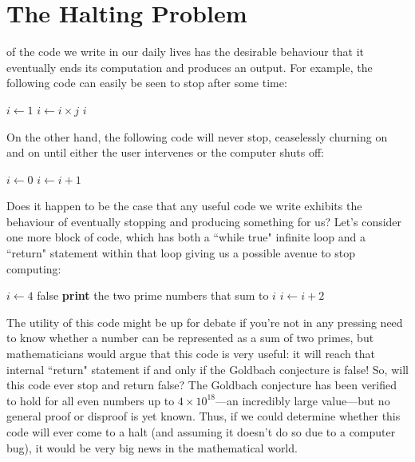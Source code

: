 \section{The Halting Problem}\label{sec:haltingproblem}

 of the code we write in our daily lives has the desirable behaviour that it eventually ends its computation and produces an output. For example, the following code can easily be seen to stop after some time:
\begin{colouredbox}
\begin{algorithmic}
\State $i \gets 1$
	\State $i \gets i \times j$
\EndFor
\State \Return $i$
\end{algorithmic}
\end{colouredbox}
\noindent
On the other hand, the following code will never stop, ceaselessly churning on and on until either the user intervenes or the computer shuts off:
\begin{colouredbox}
\begin{algorithmic}
\State $i \gets 0$
	\State $i \gets i + 1$
\EndWhile
\end{algorithmic}
\end{colouredbox}
\noindent
Does it happen to be the case that any useful code we write exhibits the behaviour of eventually stopping and producing something for us? Let's consider one more block of code, which has both a ``while true" infinite loop and a ``return" statement within that loop giving us a possible avenue to stop computing:
\begin{colouredbox}
\begin{algorithmic}
\State $i \gets 4$
		\State \Return false
	\Else
		\State \textbf{print} the two prime numbers that sum to $i$
		\State $i \gets i + 2$
	\EndIf
\EndWhile
\end{algorithmic}
\end{colouredbox}
\noindent
The utility of this code might be up for debate if you're not in any pressing need to know whether a number can be represented as a sum of two primes, but mathematicians would argue that this code is very useful: it will reach that internal ``return" statement if and only if the Goldbach conjecture is false! So, will this code ever stop and return false? The Goldbach conjecture has been verified to hold for all even numbers up to $4 \times 10^{18}$---an incredibly large value---but no general proof or disproof is yet known. Thus, if we could determine whether this code will ever come to a halt (and assuming it doesn't do so due to a computer bug), it would be very big news in the mathematical world.

